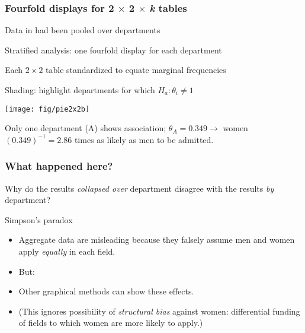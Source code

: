 \begin{frame}
 \frametitle{Fourfold displays for 2 $\times$ 2 $\times $ \textit{k} tables}
 \begin{itemize*}
 \item Data in  had been pooled over departments
 \item Stratified analysis: one fourfold display for each department
 \item Each $2 \times 2$ table standardized to equate marginal frequencies
 \item Shading: highlight departments for which $H_a : \theta_i \ne 1$

 \begin{center}
   \texttt{[image: fig/pie2x2b]}
 \end{center}
 \item Only one department (A) shows association; $\theta_A = 0.349 \rightarrow
 $ women $(0.349)^{-1} = 2.86$ times as likely as men to be admitted.
 \end{itemize*}
 \end{frame}

\begin{frame}
   \frametitle{What happened here?}
  Why do the results \emph{collapsed over} department disagree with the results \emph{by} department?
  \begin{block}{Simpson's paradox}
   \begin{itemize}
	 \item<1-> Aggregate data are misleading because they falsely
	 assume men and women apply \emph{equally} in each field.
	 \item<2-> But:
	 \item<3->
	  Other graphical methods can show these effects.
 	 \item<3-> (This ignores possibility of \emph{structural bias} against women:
	 differential funding of fields to which women are more likely to apply.)
  \end{itemize}
  \end{block}
\end{frame}

